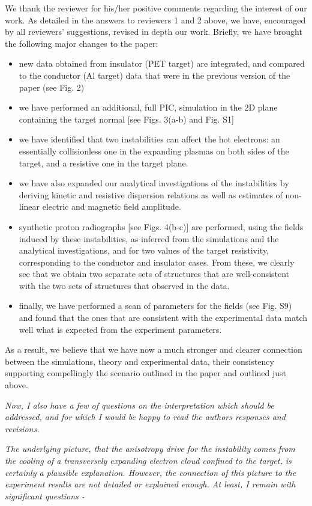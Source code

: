 \documentclass[aps,showpacs,superscriptaddress]{revtex4}%
\begin{document}
We thank the reviewer for his/her positive comments regarding the interest of our work. As detailed in the answers to reviewers 1 and 2 above, we have, encouraged by all reviewers’ suggestions, revised in depth our work.
Briefly, we have brought the following major changes to the paper:
\begin{itemize}
    \item new data obtained from insulator (PET target) are integrated, and compared to the conductor (Al target) data that were in the previous version of the paper (see Fig. 2)
    \item we have performed an additional, full PIC, simulation in the 2D plane containing the target normal [see Figs. 3(a-b) and Fig. S1]
    \item we have identified that two instabilities can affect the hot electrons: an essentially  collisionless one in the expanding plasmas on both sides of the target, and a resistive one in the target plane. 
    \item we have also expanded our analytical investigations of the instabilities by deriving kinetic and resistive dispersion relations as well as  estimates of    non-linear electric and magnetic field amplitude.
    \item synthetic proton radiographs [see Figs. 4(b-c)] are performed, using the fields induced by these instabilities, as inferred from the simulations and the analytical investigations, and for two values of the target resistivity, corresponding to the conductor and insulator cases. From these, we clearly see that we obtain two separate sets of structures that are well-consistent with the two sets of structures that observed in the data. 
    \item finally, we have performed a scan of parameters for the fields (see Fig. S9) and found that the ones that are consistent with the experimental data match well what is expected from the experiment parameters. 
\end{itemize}

As a result, we believe that we have now a much stronger and clearer connection between the simulations, theory and experimental data, their consistency supporting compellingly the scenario outlined in the paper and outlined just above.

\textit{
Now, I also have a few of questions on the interpretation which should be addressed, and for which I would be happy to read the authors responses and revisions.}

\textit{
The underlying picture, that the anisotropy drive for the instability comes from the cooling of a transversely expanding electron cloud confined to the target, is certainly a plausible explanation. However, the connection of this picture to the experiment results are not detailed or explained enough. At least, I remain with significant questions -}
\end{document}
